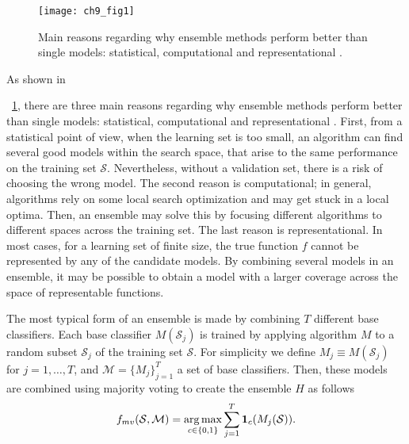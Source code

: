 \begin{figure}[t!]
\texttt{[image: ch9\_fig1]}
\caption{Main reasons regarding why ensemble methods perform better than 
  single models: statistical, computational and representational \citep{Dietterich2000a}.}
\label{fig:9:1}
\end{figure} 

As shown in \figurename{~\ref{fig:9:1}, there are three main reasons regarding why ensemble 
methods perform better than single models: statistical, computational and representational 
\citep{Dietterich2000a}. First, from a statistical point of view, when the learning set is too 
small, an algorithm can find several good models within the search space, that arise to the same 
performance on the training set $\mathcal{S}$. Nevertheless, without a validation set, there is 
a risk of choosing the wrong model. The second reason is computational; in general, algorithms 
rely on some local search optimization and may get stuck in a local optima. Then, an ensemble may 
solve this by focusing different algorithms to different spaces across the training set. The last 
reason is representational. In most cases, for a learning set of finite size, the  true function 
$f$ cannot be represented by any of the candidate models. By combining several  models in an 
ensemble, it may be possible to obtain a model with a larger coverage across the  space of 
representable functions.
  

  
  The most typical form of an ensemble is made by combining $T$ different base classifiers.
  Each  base classifier $M(\mathcal{S}_j)$ is trained by applying algorithm $M$ to a random subset 
  $\mathcal{S}_j$ of the training set $\mathcal{S}$.  %
  For simplicity we define $M_j \equiv  M(\mathcal{S}_j)$ for $j=1,\dots,T$, and 
  $\mathcal{M}=\{M_j\}_{j=1}^{T}$ a set of base classifiers.
  Then, these models are combined using majority voting to create the ensemble $H$ as follows
  \begin{align}\label{eq:9:majority-vote}
    f_{mv}(\mathcal{S},\mathcal{M}) = \operatorname*{arg\,max}_{c \in \{0,1\}} \sum_{j=1}^T 
    \mathbf{1}_c(M_j(\mathcal{S})).
  \end{align}


}
